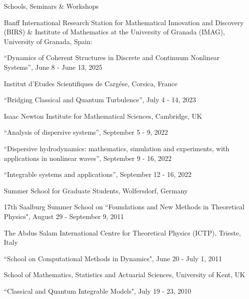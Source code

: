 \documentclass[10pt]{article} %
\newenvironment{outerlist}[1][\enskip\textbullet]%
        {\begin{itemize}[#1]}{\end{itemize}%
         \vspace{-.6\baselineskip}}
\newenvironment{innerlist}[1][\enskip\textbullet]%
        {\begin{compactitem}[#1]}{\end{compactitem}}
\begin{document}
\begin{section}{Schools, Seminars \& Workshops}
\begin{outerlist} 
\item[$\bullet$] 
\vskip -7mm
Banff International Research Station for Mathematical Innovation and Discovery
(BIRS) \& Institute of Mathematics at the University of Granada (IMAG), University
of Granada, Spain:
\begin{innerlist}
\item[$\triangleright$] ``Dynamics of Coherent Structures in Discrete and
Continuum Nonlinear Systems'', June 8 - June 13, 2025
\end{innerlist}
\item Institut d'Etudes Scientifiques de Carg\'ese, Corsica, France
\begin{innerlist}
\item[$\triangleright$] ``Bridging Classical and Quantum Turbulence'', July 4 - 14, 2023
\end{innerlist}
\item Isaac Newton Institute for Mathematical Sciences, Cambridge, UK
\begin{innerlist}
\item[$\triangleright$] ``Analysis of dispersive systems'', September 5 - 9, 2022
\item[$\triangleright$] ``Dispersive hydrodynamics: mathematics, simulation and experiments, %
with applications in nonlinear waves'', September 9 - 16, 2022
\item[$\triangleright$] ``Integrable systems and applications'', September 12 - 16, 2022
\end{innerlist}

\item[$\bullet$] 
Summer School for Graduate Students, Wolfersdorf, Germany
\begin{innerlist}
\item[$\triangleright$] 17th Saalburg  Summer School on ``Foundations and New Methods in 
Theoretical Physics", August 29 - September 9, 2011
\end{innerlist}

\item[$\bullet$] The Abdus Salam International Centre for Theoretical Physics (ICTP), Trieste, Italy
\begin{innerlist}
\item[$\triangleright$] ``School on Computational Methods in Dynamics", June 20 - July 1, 2011
\end{innerlist}

\item[$\bullet$] School of Mathematics, Statistics and Actuarial Sciences, University of Kent, UK
\begin{innerlist}
\item[$\triangleright$] ``Classical and Quantum Integrable Models", July 19 - 23, 2010
\end{innerlist}

\end{outerlist}

\end{section}
\end{document}
